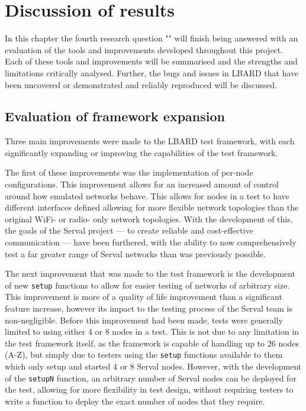 
\chapter{Discussion of results} %

\label{Chapter7} %

In this chapter the fourth research question "\fourthRQ" will finish being answered with an evaluation of the tools and improvements developed throughout this project.
Each of these tools and improvements will be summarised and the strengths and limitations critically analysed.
Further, the bugs and issues in LBARD that have been uncovered or demonstrated and reliably reproduced will be discussed.

\section{Evaluation of framework expansion}
Three main improvements were made to the LBARD test framework, with each significantly expanding or improving the capabilities of the test framework.

The first of these improvements was the implementation of per-node configurations.
This improvement allows for an increased amount of control around how emulated networks behave.
This allows for nodes in a test to have different interfaces defined allowing for more flexible network topologies than the original WiFi- or radio- only network topologies.
With the development of this, the goals of the Serval project — to create reliable and cost-effective communication — have been furthered, with the ability to now comprehensively test a far greater range of Serval networks than was previously possible.

The next improvement that was made to the test framework is the development of new \texttt{setup} functions to allow for easier testing of networks of arbitrary size.
This improvement is more of a quality of life improvement than a significant feature increase, however its impact to the testing process of the Serval team is non-negligible.
Before this improvement had been made, tests were generally limited to using either 4 or 8 nodes in a test. 
This is not due to any limitation in the test framework itself, as the framework is capable of handling up to 26 nodes (A-Z), but simply due to testers using the \texttt{setup} functions available to them which only setup and started 4 or 8 Serval nodes.
However, with the development of the \texttt{setupN} function, an arbitrary number of Serval nodes can be deployed for the test, allowing for more flexibility in test design, without requiring testers to write a function to deploy the exact number of nodes that they require.

